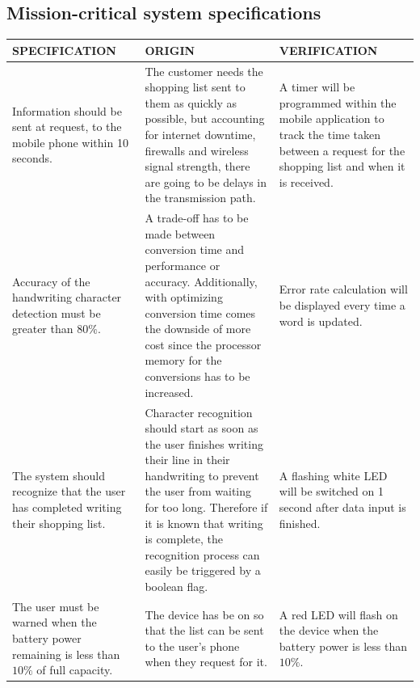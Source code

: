{\subsection{Mission-critical system specifications}
\begin{center}
	\begin{longtable}{|p{5cm}|p{5cm}|p{5cm}|}
		\hline
		\textbf{SPECIFICATION} &
		\textbf{ORIGIN} &
		\textbf{VERIFICATION}\\
		\hline
		Information should be sent at request, to the mobile phone within 10 seconds.
		&
		The customer needs the shopping list sent to them as quickly as possible, but accounting for internet downtime, firewalls and wireless signal strength, there are going to be delays in the transmission path.
		&
		A timer will be programmed within the mobile application to track the time taken between a  request for the shopping list and when it is received.
		\\
		\hline
		Accuracy of the handwriting character detection must be greater than 80$\%$.
		&
		A trade-off has to be made between conversion time and performance or accuracy. Additionally, with optimizing conversion time comes the downside of more cost since the processor memory for the conversions has to be increased.
		&
		Error rate calculation will be displayed every time a word is updated. \\
		\hline
		The system should recognize that the user has completed writing their shopping list.
		&
		Character recognition should start as soon as the user finishes writing their line in their handwriting to prevent the user from waiting for too long. Therefore if it is known that writing is complete, the recognition process can easily be triggered by a boolean flag.
		&
		A flashing white LED will be switched on 1 second after data input is finished.
		\\
		\hline
		The user must be warned when the battery power remaining is less than $10\%$ of full capacity.
		&
		The device has be on so that the list can be sent to the user's phone when they request for it.
		& 
		A red LED will flash on the device when the battery power is less than $10\%$.\\

\end{longtable}
\end{center}}
